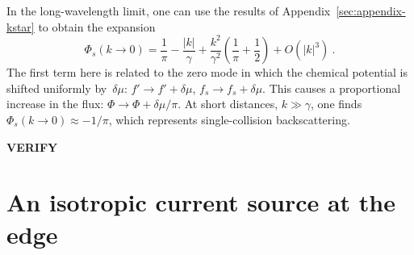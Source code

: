 \documentclass[preprint,aps,eqsecnum]{revtex4-1}
\begin{document}
In the long-wavelength limit, one can  use  the results of
Appendix~\ref{sec:appendix-kstar} to obtain the expansion
\begin{equation}
  \label{eq:phi-s-low}
  \Phi_s(k\to 0) = \frac{1}{\pi} - \frac{|k|}{\gamma} + \frac{k^2}{\gamma^2}
  \left(\frac{1}{\pi} + \frac{1}{2}\right)
  + O(|k|^3)
  \ .
\end{equation}
The first term here is related to the zero mode in which the chemical
potential is shifted uniformly by~$\delta \mu$:
$f' \to f' + \delta\mu$, $f_s \to f_s +  \delta\mu$. This causes
a proportional increase in the flux: $\Phi \to \Phi + \delta\mu/\pi$.
At short distances, $k \gg \gamma$, one finds~$\Phi_s(k\to0) \approx - 1/\pi$,
which represents single-collision backscattering.

\textbf{VERIFY}

\section{An isotropic current source at the edge}
\label{sec:boundary-src}
\end{document}
